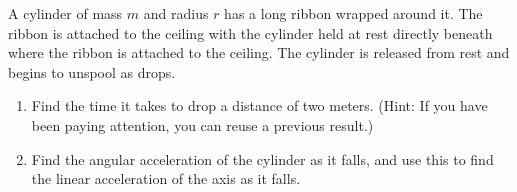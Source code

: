 \begin{exercise}
A cylinder of mass $m$ and radius $r$ has a long ribbon wrapped around it. The ribbon is attached to the ceiling with the cylinder held at rest directly beneath where the ribbon is attached to the ceiling. The cylinder is released from rest and begins to unspool as drops.
\begin{enumerate}
	\item Find the time it takes to drop a distance of two meters. (Hint: If you have been paying attention, you can reuse a previous result.) 
	\item Find the angular acceleration of the cylinder as it falls, and use this to find the linear acceleration of the axis as it falls. 
\end{enumerate}
\end{exercise}


